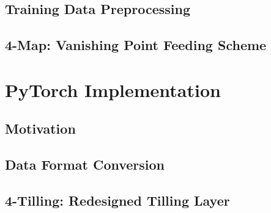\begin{spacing}{1.5}
\subsection{Training Data Preprocessing}

\subsection{4-Map: Vanishing Point Feeding Scheme}


\section{PyTorch Implementation}

\subsection{Motivation}

\subsection{Data Format Conversion}

\subsection{4-Tilling: Redesigned Tilling Layer}


\end{spacing}
\newpage
